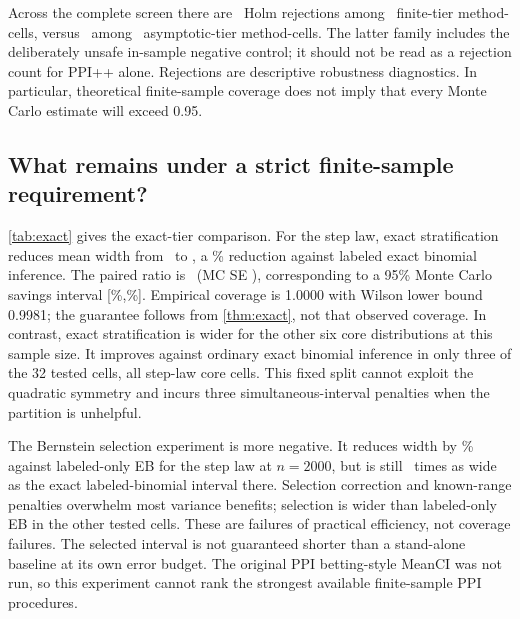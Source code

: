 \documentclass{article}
\begin{document}
Across the complete screen there are \FiniteRejects\ Holm rejections among \FiniteTests\ finite-tier method-cells, versus \AsymRejects\ among \AsymTests\ asymptotic-tier method-cells. The latter family includes the deliberately unsafe in-sample negative control; it should not be read as a rejection count for PPI++ alone. Rejections are descriptive robustness diagnostics. In particular, theoretical finite-sample coverage does not imply that every Monte Carlo estimate will exceed 0.95.

\subsection{What remains under a strict finite-sample requirement?}
\begin{table}[t]
\centering\small
\caption{Finite-sample-valid comparison at $n=2000,N=20000$. Both procedures have analytical coverage guarantees for binary outcomes under the stated iid design. The paired ratio is exact-stratified width divided by labeled-only exact-binomial width; smaller is narrower. Its Monte Carlo standard error is in parentheses. Coverage targets 0.95; no dominance across distributions is obtained.}
\label{tab:exact}

\end{table}

\cref{tab:exact} gives the exact-tier comparison. For the step law, exact stratification reduces mean width from \CPstepWidth\ to \ExactStepWidth, a \ExactSaving\% reduction against labeled exact binomial inference. The paired ratio is \ExactStepRatio\ (MC SE \ExactStepRatioSE), corresponding to a 95\% Monte Carlo savings interval [\ExactSavingLo\%,\ExactSavingHi\%]. Empirical coverage is 1.0000 with Wilson lower bound 0.9981; the guarantee follows from \cref{thm:exact}, not that observed coverage. In contrast, exact stratification is wider for the other six core distributions at this sample size. It improves against ordinary exact binomial inference in only three of the 32 tested cells, all step-law core cells. This fixed split cannot exploit the quadratic symmetry and incurs three simultaneous-interval penalties when the partition is unhelpful.

The Bernstein selection experiment is more negative. It reduces width by \EBstepSaving\% against labeled-only EB for the step law at $n=2000$, but is still \EBstepRatioCP\ times as wide as the exact labeled-binomial interval there. Selection correction and known-range penalties overwhelm most variance benefits; selection is wider than labeled-only EB in the other tested cells. These are failures of practical efficiency, not coverage failures. The selected interval is not guaranteed shorter than a stand-alone baseline at its own error budget. The original PPI betting-style MeanCI was not run, so this experiment cannot rank the strongest available finite-sample PPI procedures.
\end{document}
